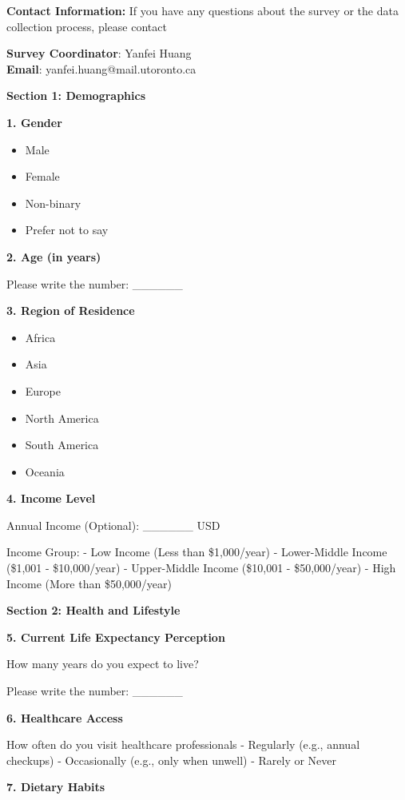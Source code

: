 \documentclass[
  letterpaper,
  DIV=11,
  numbers=noendperiod]{scrartcl}
\providecommand{\tightlist}{%
  \setlength{\itemsep}{0pt}\setlength{\parskip}{0pt}}\usepackage{longtable,booktabs,array}
\begin{document}
\textbf{Contact Information:} If you have any questions about the survey
or the data collection process, please contact

\textbf{Survey Coordinator}: Yanfei Huang\\
\textbf{Email}: yanfei.huang@mail.utoronto.ca

\textbf{Section 1: Demographics}

\textbf{1. Gender}

\begin{itemize}
\tightlist
\item
  Male
\item
  Female
\item
  Non-binary
\item
  Prefer not to say
\end{itemize}

\textbf{2. Age (in years)}

Please write the number: \_\_\_\_\_\_

\textbf{3. Region of Residence}

\begin{itemize}
\tightlist
\item
  Africa
\item
  Asia
\item
  Europe
\item
  North America
\item
  South America
\item
  Oceania
\end{itemize}

\textbf{4. Income Level}

Annual Income (Optional): \_\_\_\_\_\_ USD

Income Group: - Low Income (Less than \$1,000/year) - Lower-Middle
Income (\$1,001 - \$10,000/year) - Upper-Middle Income (\$10,001 -
\$50,000/year) - High Income (More than \$50,000/year)

\textbf{Section 2: Health and Lifestyle}

\textbf{5. Current Life Expectancy Perception}

How many years do you expect to live?

Please write the number: \_\_\_\_\_\_

\textbf{6. Healthcare Access}

How often do you visit healthcare professionals - Regularly (e.g.,
annual checkups) - Occasionally (e.g., only when unwell) - Rarely or
Never

\textbf{7. Dietary Habits}
\end{document}

